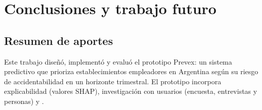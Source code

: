 \chapter{Conclusiones y trabajo futuro}\label{ch:conclusiones}

\section{Resumen de aportes}

Este trabajo dise\~n\'o, implement\'o y evalu\'o el prototipo Prevex: un sistema predictivo que prioriza establecimientos empleadores en Argentina seg\'un su riesgo de accidentabilidad en un horizonte trimestral.
El prototipo incorpora explicabilidad (valores SHAP), investigaci\'on con usuarios (encuesta, entrevistas y personas) y .

